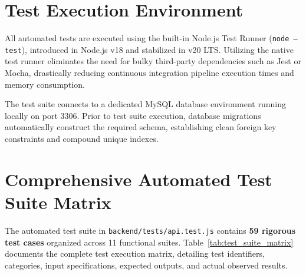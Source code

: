 \documentclass[11pt,a4paper]{report}
\begin{document}
\section{Test Execution Environment}
\justifying
All automated tests are executed using the built-in Node.js Test Runner (\texttt{node --test}), introduced in Node.js v18 and stabilized in v20 LTS. Utilizing the native test runner eliminates the need for bulky third-party dependencies such as Jest or Mocha, drastically reducing continuous integration pipeline execution times and memory consumption.

The test suite connects to a dedicated MySQL database environment running locally on port 3306. Prior to test suite execution, database migrations automatically construct the required schema, establishing clean foreign key constraints and compound unique indexes.

\section{Comprehensive Automated Test Suite Matrix}
\justifying
The automated test suite in \texttt{backend/tests/api.test.js} contains \textbf{59 rigorous test cases} organized across 11 functional suites. Table~\ref{tab:test_suite_matrix} documents the complete test execution matrix, detailing test identifiers, categories, input specifications, expected outputs, and actual observed results.
\end{document}
